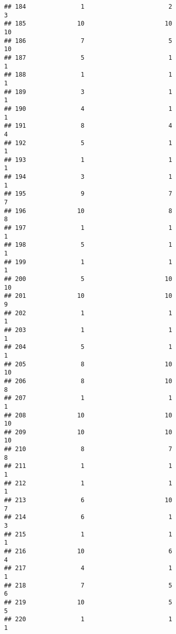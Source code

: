 \documentclass[
]{article}
\begin{document}
\begin{verbatim}
## 184               1                       2                        3
## 185              10                      10                       10
## 186               7                       5                       10
## 187               5                       1                        1
## 188               1                       1                        1
## 189               3                       1                        1
## 190               4                       1                        1
## 191               8                       4                        4
## 192               5                       1                        1
## 193               1                       1                        1
## 194               3                       1                        1
## 195               9                       7                        7
## 196              10                       8                        8
## 197               1                       1                        1
## 198               5                       1                        1
## 199               1                       1                        1
## 200               5                      10                       10
## 201              10                      10                        9
## 202               1                       1                        1
## 203               1                       1                        1
## 204               5                       1                        1
## 205               8                      10                       10
## 206               8                      10                        8
## 207               1                       1                        1
## 208              10                      10                       10
## 209              10                      10                       10
## 210               8                       7                        8
## 211               1                       1                        1
## 212               1                       1                        1
## 213               6                      10                        7
## 214               6                       1                        3
## 215               1                       1                        1
## 216              10                       6                        4
## 217               4                       1                        1
## 218               7                       5                        6
## 219              10                       5                        5
## 220               1                       1                        1

\end{verbatim}
\end{document}
